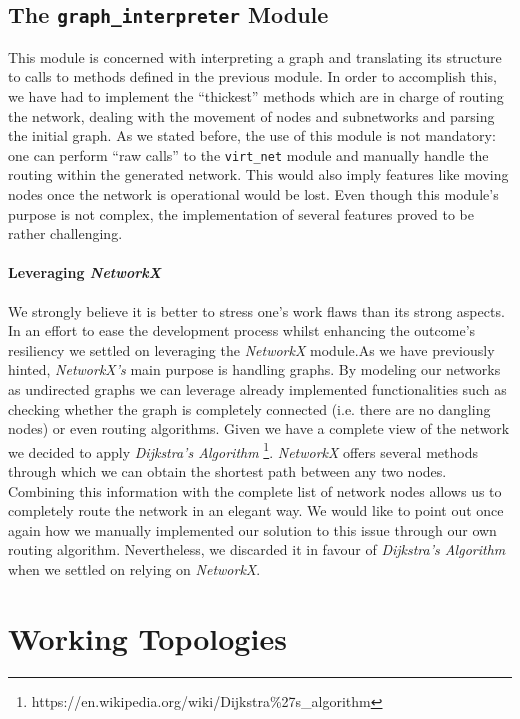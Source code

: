         \subsection{The \texttt{graph\_interpreter} Module}
            This module is concerned with interpreting a graph and translating its structure to calls to methods defined in the previous module. In order to accomplish this, we have had to implement the ``thickest'' methods which are in charge of routing the network, dealing with the movement of nodes and subnetworks and parsing the initial graph. As we stated before, the use of this module is not mandatory: one can perform ``raw calls'' to the \texttt{virt\_net} module and manually handle the routing within the generated network. This would also imply features like moving nodes once the network is operational would be lost. Even though this module's purpose is not complex, the implementation of several features proved to be rather challenging.\\

            \paragraph{Leveraging \textit{NetworkX}}
                We strongly believe it is better to stress one's work flaws than its strong aspects. In an effort to ease the development process whilst enhancing the outcome's resiliency we settled on leveraging the \textit{NetworkX} module.As we have previously hinted, \textit{NetworkX's} main purpose is handling graphs. By modeling our networks as undirected graphs we can leverage already implemented functionalities such as checking whether the graph is completely connected (i.e. there are no dangling nodes) or even routing algorithms. Given we have a complete view of the network we decided to apply \textit{Dijkstra's Algorithm} \footnote{https://en.wikipedia.org/wiki/Dijkstra\%27s_algorithm}. \textit{NetworkX} offers several methods through which we can obtain the shortest path between any two nodes. Combining this information with the complete list of network nodes allows us to completely route the network in an elegant way. We would like to point out once again how we manually implemented our solution to this issue through our own routing algorithm. Nevertheless, we discarded it in favour of \textit{Dijkstra's Algorithm} when we settled on relying on \textit{NetworkX}.

            

    \section{Working Topologies}
